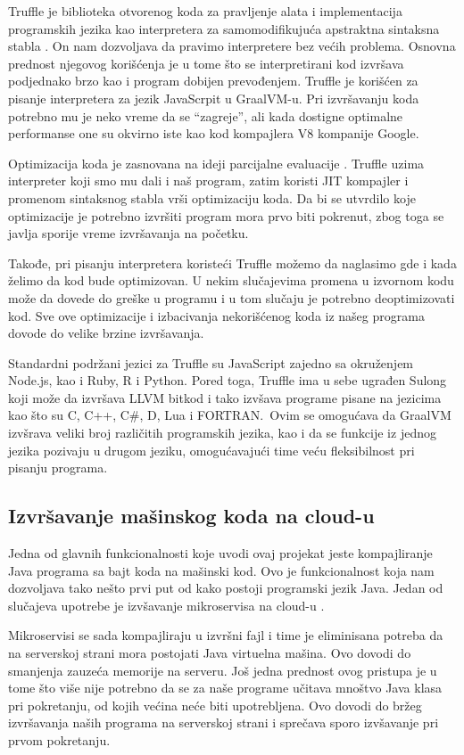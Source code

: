 \documentclass[a4paper]{article}
\begin{document}
Truffle je biblioteka otvorenog koda za pravljenje alata i implementacija programskih jezika kao interpretera za samomodifikujuća apstraktna sintaksna stabla \cite{graalvm}. On nam dozvoljava da pravimo interpretere bez većih problema. Osnovna prednost njegovog korišćenja je u tome što se interpretirani kod izvršava podjednako brzo kao i program dobijen prevođenjem. Truffle je korišćen za pisanje interpretera za jezik JavaScrpit u GraalVM-u. Pri izvršavanju koda potrebno mu je neko vreme da se ``zagreje'', ali kada dostigne optimalne performanse one su okvirno iste kao kod kompajlera V8 kompanije Google.

Optimizacija koda je zasnovana na ideji parcijalne evaluacije \cite{graalvm}. Truffle uzima interpreter koji smo mu dali i naš program, zatim koristi JIT kompajler i promenom sintaksnog stabla vrši optimizaciju koda. Da bi se utvrdilo koje optimizacije je potrebno izvršiti program mora prvo biti pokrenut, zbog toga se javlja sporije vreme izvršavanja na početku.

Takođe, pri pisanju interpretera koristeći Truffle možemo da naglasimo gde i kada želimo da kod bude optimizovan. U nekim slučajevima promena u izvornom kodu može da dovede do greške u programu i u tom slučaju je potrebno deoptimizovati kod. Sve ove optimizacije i izbacivanja nekorišćenog koda iz našeg programa dovode do velike brzine izvršavanja.

Standardni podržani jezici za Truffle su JavaScript zajedno sa okruženjem Node.js, kao i Ruby, R i Python. Pored toga, Truffle ima u sebe ugrađen Sulong koji može da izvršava LLVM bitkod i tako izvšava programe pisane na jezicima kao što su C, C++, C\#, D, Lua i FORTRAN.\ Ovim se omogućava da GraalVM izvšrava veliki broj različitih programskih jezika, kao i da se funkcije iz jednog jezika pozivaju u drugom jeziku, omogućavajući time veću fleksibilnost pri pisanju programa.

\subsection{Izvršavanje mašinskog koda na cloud-u}
\label{sub:cloud}

Jedna od glavnih funkcionalnosti koje uvodi ovaj projekat jeste kompajliranje Java programa sa bajt koda na mašinski kod. Ovo je funkcionalnost koja nam dozvoljava tako nešto prvi put od kako postoji programski jezik Java. Jedan od slučajeva upotrebe je izvšavanje mikroservisa na cloud-u \cite{sipek21}.

Mikroservisi se sada kompajliraju u izvršni fajl i time je eliminisana potreba da na serverskoj strani mora postojati Java virtuelna mašina. Ovo dovodi do smanjenja zauzeća memorije na serveru. Još jedna prednost ovog pristupa je u tome što više nije potrebno da se za naše programe učitava mnoštvo Java klasa pri pokretanju, od kojih većina neće biti upotrebljena. Ovo dovodi do bržeg izvršavanja naših programa na serverskoj strani i sprečava sporo izvšavanje pri prvom pokretanju. 
\end{document}
